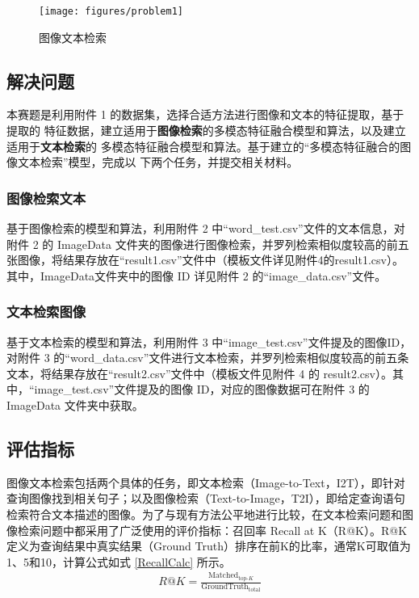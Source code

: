 \documentclass[a4paper]{zreport}
\begin{document}
\begin{figure}[h]
\centering
\texttt{[image: figures/problem1]}
\caption{图像文本检索}
\label{fig:problem1}
\end{figure}

\subsection{解决问题}

本赛题是利用附件 1 的数据集，选择合适方法进行图像和文本的特征提取，基于提取的
特征数据，建立适用于\textbf{图像检索}的多模态特征融合模型和算法，以及建立适用于\textbf{文本检索}的
多模态特征融合模型和算法。基于建立的“多模态特征融合的图像文本检索”模型，完成以
下两个任务，并提交相关材料。

\subsubsection[图像检索文本]{\textbf{图像检索文本}}

基于图像检索的模型和算法，利用附件 2 中“word\_test.csv”文件的文本信息，对附件 2 的 ImageData 文件夹的图像进行图像检索，并罗列检索相似度较高的前五张图像，将结果存放在“result1.csv”文件中（模板文件详见附件4的result1.csv）。其中，ImageData文件夹中的图像 ID 详见附件 2 的“image\_data.csv”文件。

\subsubsection[文本检索图像]{\textbf{文本检索图像}}

基于文本检索的模型和算法，利用附件 3 中“image\_test.csv”文件提及的图像ID，对附件 3 的“word\_data.csv”文件进行文本检索，并罗列检索相似度较高的前五条文本，将结果存放在“result2.csv”文件中（模板文件见附件 4 的 result2.csv）。其中，“image\_test.csv”文件提及的图像 ID，对应的图像数据可在附件 3 的 ImageData 文件夹中获取。

\subsection{评估指标}

图像文本检索包括两个具体的任务，即文本检索（Image-to-Text，I2T），即针对查询图像找到相关句子；以及图像检索（Text-to-Image，T2I），即给定查询语句检索符合文本描述的图像。为了与现有方法公平地进行比较，在文本检索问题和图像检索问题中都采用了广泛使用的评价指标：召回率 Recall at K（R@K）。R@K定义为查询结果中真实结果（Ground Truth）排序在前K的比率，通常K可取值为1、5和10，计算公式如式 \eqref{RecallCalc} 所示。
\begin{gather}
R@K=\frac{\mathrm{Matched}_{\text{top-}K}}{\mathrm{GroundTruth}_{\text{total}}}\label{RecallCalc}
\end{gather}
\end{document}
